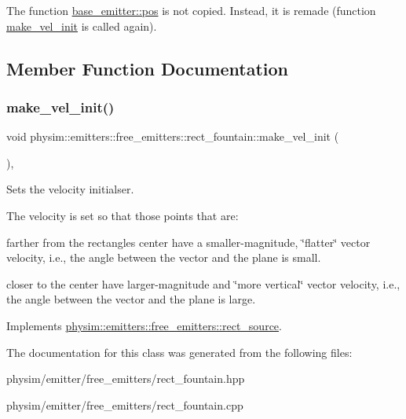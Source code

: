 The function \hyperlink{classphysim_1_1emitters_1_1base__emitter_ac67584a2ca34232c1f4f04c41599df0e}{base\+\_\+emitter\+::pos} is not copied. Instead, it is remade (function \hyperlink{classphysim_1_1emitters_1_1free__emitters_1_1rect__fountain_a86c3d792fa977ef2b97785abced613ae}{make\+\_\+vel\+\_\+init} is called again). 

\subsection{Member Function Documentation}
\mbox{\label{classphysim_1_1emitters_1_1free__emitters_1_1rect__fountain_a86c3d792fa977ef2b97785abced613ae}} 
\subsubsection{\texorpdfstring{make\+\_\+vel\+\_\+init()}{make\_vel\_init()}}
{\footnotesize\ttfamily void physim\+::emitters\+::free\+\_\+emitters\+::rect\+\_\+fountain\+::make\+\_\+vel\+\_\+init (\begin{DoxyParamCaption}{ }\end{DoxyParamCaption})\hspace{0.3cm}{\ttfamily [protected]}, {\ttfamily [virtual]}}



Sets the velocity initialser. 

The velocity is set so that those points that are\+:
\begin{DoxyItemize}
\item farther from the rectangle\textquotesingle{}s center have a smaller-\/magnitude, \char`\"{}flatter\char`\"{} vector velocity, i.\+e., the angle between the vector and the plane is small.
\item closer to the center have larger-\/magnitude and \char`\"{}more vertical\char`\"{} vector velocity, i.\+e., the angle between the vector and the plane is large. 
\end{DoxyItemize}

Implements \hyperlink{classphysim_1_1emitters_1_1free__emitters_1_1rect__source_aace4d8f596f2a138e098ab0f86e927b5}{physim\+::emitters\+::free\+\_\+emitters\+::rect\+\_\+source}.



The documentation for this class was generated from the following files\+:\begin{DoxyCompactItemize}
\item 
physim/emitter/free\+\_\+emitters/rect\+\_\+fountain.\+hpp\item 
physim/emitter/free\+\_\+emitters/rect\+\_\+fountain.\+cpp\end{DoxyCompactItemize}
